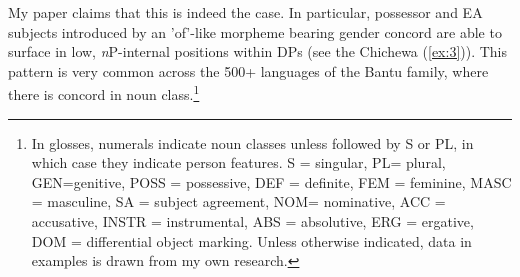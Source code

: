 \documentclass[output=paper
,modfonts
,nonflat]{langsci/langscibook}
\begin{document}
My paper claims that this is indeed the case. In particular, possessor and EA {\textquotedbl}subjects{\textquotedbl} introduced by an 'of'-like morpheme bearing gender concord are able to surface in low, \textit{n}P-internal positions within DPs (see the Chichewa (\ref{ex:3})). This pattern is very common across the 500+ languages of the Bantu family, where there is concord in noun class.\footnote{In glosses, numerals indicate noun classes unless followed by S or PL, in which case they indicate person features. S = singular, PL= plural, GEN=genitive, POSS = possessive, DEF = definite, FEM = feminine, MASC = masculine, SA = subject agreement, NOM= nominative, ACC = accusative, INSTR = instrumental, ABS = absolutive, ERG = ergative, DOM = differential object marking. Unless otherwise indicated, data in examples is drawn from my own research.}
\end{document}
